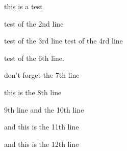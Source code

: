 this is a test

test of the 2nd line

test of the 3rd line
test of the 4rd line

test of the 6th line.

don't forget the 7th line

this is the 8th line

9th line
and the 10th line

and this is the 11th line

and this is the 12th line
